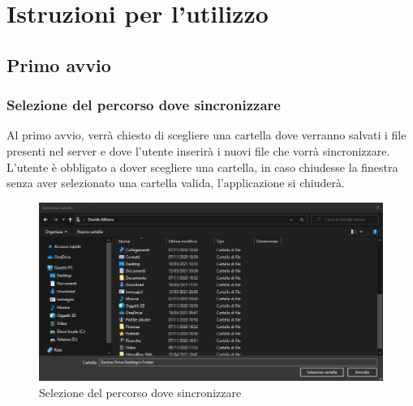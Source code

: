 \section{Istruzioni per l'utilizzo}

\subsection{Primo avvio}
\subsubsection{Selezione del percorso dove sincronizzare}
\label{sec:selezionepath}
Al primo avvio, verrà chiesto di scegliere una cartella dove verranno salvati i file presenti nel server e dove l'utente inserirà i nuovi file che vorrà sincronizzare.
L'utente è obbligato a dover scegliere una cartella, in caso chiudesse la finestra senza aver selezionato una cartella valida, l'applicazione si chiuderà.
\begin{figure}[H]
    \centering
    \includegraphics[scale = 0.50]{components/img/selezione-path.png}
    \caption{Selezione del percorso dove sincronizzare}
    \label{fig:Selezione del percorso dove sincronizzare}
\end{figure}


